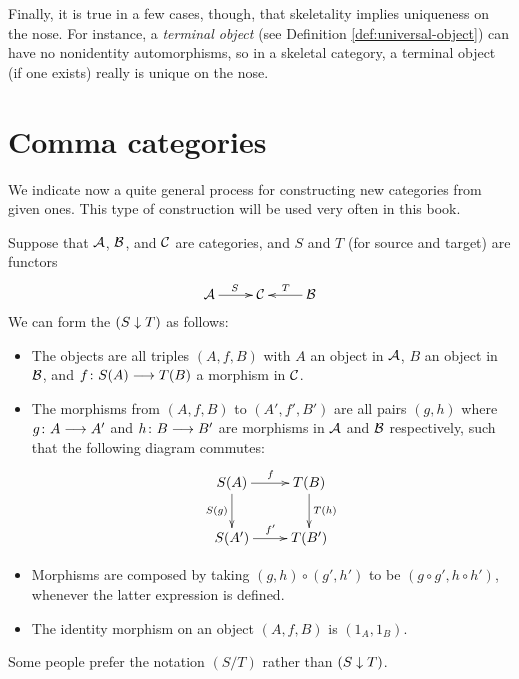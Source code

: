     Finally, it is true in a few cases, though, that skeletality implies uniqueness on the nose. For instance, a \emph{terminal object} (see Definition \ref{def:universal-object}) can have no nonidentity automorphisms, so in a skeletal category, a terminal object (if one exists) really is unique on the nose.

\newpage\section{Comma categories}
  We indicate now a quite general process for constructing new categories from given ones. This type of construction will be used very often in this book.

  \begin{defn}
    Suppose that ${\cal A}$, ${\cal B}$, and ${\cal C}$ are categories, and $S$ and $T$ (for source and target) are functors
          \begin{displaymath}
            \xymatrix{
               \Aa\ar[r]^{S} & \Cc & \Bb\ar[l]_{T}                }
          \end{displaymath}
    We can form the  $(S\downarrow T)$ as follows:  
    \begin{itemize}
      \item The objects are all triples $(A,f,B)$ with $A$ an object in ${\cal A}$, $B$ an object in ${\cal B}$, and $f\colon S(A)\longrightarrow T(B)$ a morphism in ${\cal C}$.
      \item The morphisms from $(A,f,B)$ to $(A',f',B')$ are all pairs $(g,h)$
                 where $g\colon A\longrightarrow A'$ and $h\colon B\longrightarrow B'$ are morphisms in ${\cal A}$ and ${\cal B}$ respectively, such that the following diagram commutes:
                 \begin{displaymath}
                   \xymatrix{
                       S(A)\ar[d]_{S(g)}\ar[r]^{f} & T(B)\ar[d]^{T(h)}  \\
                       S(A')\ar[r]^{f'} & T(B')           }
                 \end{displaymath}
      \item Morphisms are composed by taking $(g,h)\circ(g',h')$ to be $(g\circ g',h\circ h')$, whenever the latter expression is defined.
      \item The identity morphism on an object $(A,f,B)$ is $(1_{A},1_{B})$.
    \end{itemize}
  \end{defn}
  \begin{rem}
    Some people prefer the notation $(S/T)$ rather than $(S\downarrow T)$.
  \end{rem}


